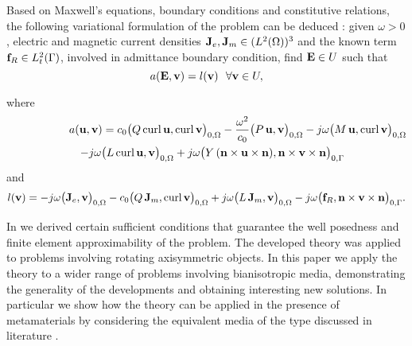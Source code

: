 Based on Maxwell's equations, boundary conditions and constitutive relations, 
the following variational formulation of the problem can be deduced \cite{bianisotropi_m3as}:
given $\omega>0$, 
  electric and magnetic current densities ${\bf J}_e, {\bf J}_m \in (L^2(\Omega))^3$ 
  and the known term ${\bf f}_R \in L^2_t(\Gamma)$, involved in admittance boundary condition, 
  find ${\bf E} \in U$ such that
  \begin{equation} \label{eq:variationalprob}
    a({\bf E},{\bf v}) = l({\bf v}) \ \ \forall {\bf v} \in U, 
  \end{equation}

\noindent
where
%
\begin{eqnarray} \label{eq:sesquilinear}
  \lefteqn{
    a({\bf u}, {\bf v})
    =
    c_0 
    \big(
      Q \, \mathrm{curl} \, {\bf u}, 
      \mathrm{curl} \, {\bf v}
    \big)_{0,\Omega}
    -
    \frac{\omega^2}{c_0} 
    \big( 
      P \, {\bf u},
      {\bf v}
    \big)_{0,\Omega}
    -
    j \omega
    \big( 
      M \, {\bf u},
      \mathrm{curl} \, {\bf v}
    \big)_{0,\Omega}
  }
  & &
  \nonumber
  \\
  & &
  -
  j \omega
  \big( 
    L \, \mathrm{curl} \, {\bf u},
    {\bf v}
  \big)_{0,\Omega}
  +
  j \omega 
  \big(
    Y \, ({\bf n} \times {\bf u} \times {\bf n}),
    {\bf n} \times {\bf v} \times {\bf n}
  \big)_{0,\Gamma}
\end{eqnarray}
%
and
%
\begin{equation} \label{antilinear}
  l({\bf v})
  =
  -
  j \omega 
  \big(
    {\bf J}_e, {\bf v}
  \big)_{0,\Omega}
  -
  c_0
  \big(
    Q \, {\bf J}_m, \mathrm{curl} \, {\bf v}
  \big)_{0,\Omega}
  +
  j \omega 
  \big(
    L \, {\bf J}_m,
    {\bf v}
  \big)_{0,\Omega}
  -
  j \omega 
  \big(
    {\bf f}_R,{\bf n} \times {\bf v} \times {\bf n}
  \big)_{0,\Gamma}.
\end{equation}
%

In \cite{kalarickel2020well} we derived certain sufficient conditions that 
guarantee the well posedness and finite element approximability of the problem.
The developed theory was applied to problems involving rotating axisymmetric objects.
In this paper we apply the theory to a wider range of problems involving bianisotropic media, 
demonstrating the generality of the developments and obtaining interesting new solutions.
In particular we show how the theory can be applied in the presence of metamaterials by 
considering the equivalent media of the type discussed in literature \cite{pendry2016acsphotonics}.


